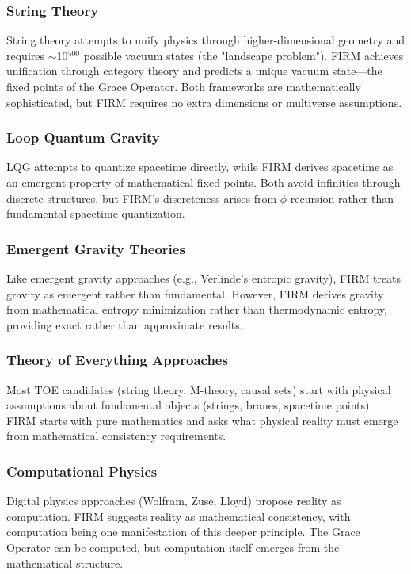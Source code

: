 \documentclass[12pt]{article}
\begin{document}
\subsubsection{String Theory}
String theory attempts to unify physics through higher-dimensional geometry and requires $\sim$10$^{500}$ possible vacuum states (the "landscape problem"). FIRM achieves unification through category theory and predicts a unique vacuum state—the fixed points of the Grace Operator. Both frameworks are mathematically sophisticated, but FIRM requires no extra dimensions or multiverse assumptions.

\subsubsection{Loop Quantum Gravity}
LQG attempts to quantize spacetime directly, while FIRM derives spacetime as an emergent property of mathematical fixed points. Both avoid infinities through discrete structures, but FIRM's discreteness arises from $\phi$-recursion rather than fundamental spacetime quantization.

\subsubsection{Emergent Gravity Theories}
Like emergent gravity approaches (e.g., Verlinde's entropic gravity), FIRM treats gravity as emergent rather than fundamental. However, FIRM derives gravity from mathematical entropy minimization rather than thermodynamic entropy, providing exact rather than approximate results.

\subsubsection{Theory of Everything Approaches}
Most TOE candidates (string theory, M-theory, causal sets) start with physical assumptions about fundamental objects (strings, branes, spacetime points). FIRM starts with pure mathematics and asks what physical reality must emerge from mathematical consistency requirements.

\subsubsection{Computational Physics}
Digital physics approaches (Wolfram, Zuse, Lloyd) propose reality as computation. FIRM suggests reality as mathematical consistency, with computation being one manifestation of this deeper principle. The Grace Operator can be computed, but computation itself emerges from the mathematical structure.
\end{document}
